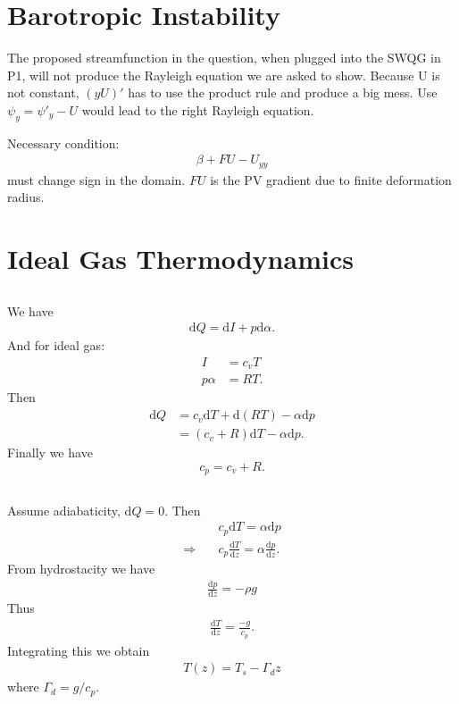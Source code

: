 \documentclass[11pt,letterpaper]{book}
\theoremstyle{definition}
\newcommand{\de}{\mathrm{d}}
\newcommand{\thus}{\Rightarrow \quad }
\begin{document}
\section{Barotropic Instability}
The proposed streamfunction in the question, when plugged into the SWQG in P1, will not produce the Rayleigh equation we are asked to show. Because U is not constant, $(yU)'$ has to use the product rule and produce a big mess. Use $\psi_y = \psi'_y-U$ would lead to the right Rayleigh equation.

Necessary condition:
\begin{align*}
\beta+FU-U_{yy}
\end{align*}
must change sign in the domain. $FU$ is the PV gradient due to finite deformation radius. 

\section{Ideal Gas Thermodynamics}\label{Jan_2010_Prob3}
\subsection{}
We have
\begin{align*}
\de Q = \de I+p\de \alpha.
\end{align*}
And for ideal gas: 
\begin{align*}
I &= c_v T\\
p\alpha &= RT.
\end{align*}
Then
\begin{align*}
\de Q &= c_v\de T+ \de(RT)-\alpha\de p\\
&= (c_v+R)\de T-\alpha\de p.
\end{align*}
Finally we have
$$c_p = c_v+R.$$

\subsection{}\label{jan_2010_3_2}
Assume adiabaticity, $\de Q = 0$. Then
\begin{align*}
&c_p\de T = \alpha\de p\\
\thus &c_p\frac{\de T}{\de z} = \alpha\frac{\de p}{\de z}.
\end{align*}
From hydrostacity we have
\begin{align*}
\frac{\de p}{\de z} = -\rho g
\end{align*}
Thus
\begin{align*}
\frac{\de T}{\de z} = \frac{-g}{c_p}.
\end{align*}
Integrating this we obtain
\begin{align*}
T(z) = T_s-\Gamma_dz
\end{align*}
where $\Gamma_d = g/c_p$.
\end{document}
